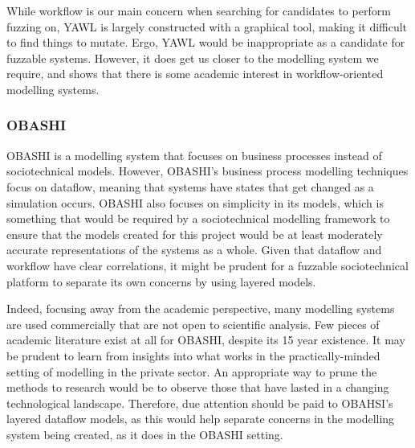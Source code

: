 \documentclass{sig-alternate}
\begin{document}
While workflow is our main concern when searching for candidates to perform fuzzing on, YAWL is largely constructed with a graphical tool, making it difficult to find things to mutate. Ergo, YAWL would be inappropriate as a candidate for fuzzable systems. However, it does get us closer to the modelling system we require, and shows that there is some academic interest in workflow-oriented modelling systems. \par

\subsubsection{OBASHI}
OBASHI\cite{ObashiMethodology} is a modelling system that focuses on business processes instead of sociotechnical models. However, OBASHI's business process modelling techniques focus on dataflow, meaning that systems have states that get changed as a simulation occurs. OBASHI also focuses on simplicity in its models, which is something that would be required by a sociotechnical modelling framework to ensure that the models created for this project would be at least moderately accurate representations of the systems as a whole. Given that dataflow and workflow have clear correlations, it might be prudent for a fuzzable sociotechnical platform to separate its own concerns by using layered models. \par 

Indeed, focusing away from the academic perspective, many modelling systems are used commercially that are not open to scientific analysis. Few pieces of academic literature exist at all for OBASHI, despite its 15 year existence. It may be prudent to learn from insights into what works in the practically-minded setting of modelling in the private sector. An appropriate way to prune the methods to research would be to observe those that have lasted in a changing technological landscape. Therefore, due attention should be paid to OBAHSI's layered dataflow models, as this would help separate concerns in the modelling system being created, as it does in the OBASHI setting. \par

\end{document}
